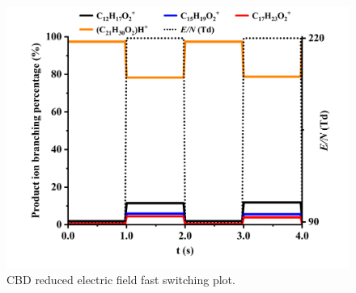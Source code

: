 \begin{figure}[htb]
\centering
\includegraphics[width=0.50\linewidth]{pics/other_drugs/CBD-fs-90-220.png}
\caption{CBD reduced electric field fast switching plot.}
\label{fig:DR_CBD_fs}
\end{figure}














